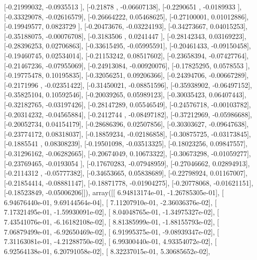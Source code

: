 \documentclass{article}
\begin{document}
       [-0.21999032, -0.0935513 ],
       [-0.21878   , -0.06607138],
       [-0.2290651 , -0.0189933 ],
       [-0.33329078, -0.02616579],
       [-0.26664222,  0.05468625],
       [-0.27100001,  0.01012886],
       [-0.19949577,  0.0823729 ],
       [-0.20473676, -0.03224193],
       [-0.34273667,  0.04015253],
       [-0.35188075, -0.00076708],
       [-0.3183506 ,  0.0241447 ],
       [-0.28142343,  0.03169223],
       [-0.28396253,  0.02706863],
       [-0.33615495, -0.05995591],
       [-0.20461433, -0.09150458],
       [-0.19460745,  0.02534014],
       [-0.21153242,  0.08517602],
       [-0.23658394, -0.07427764],
       [-0.21467236, -0.07955069],
       [-0.24913084, -0.00920076],
       [-0.17825295,  0.0578553 ],
       [-0.19775478,  0.10195835],
       [-0.32056251,  0.09206366],
       [-0.24394706, -0.00667289],
       [-0.2171996 , -0.02351422],
       [-0.31450021, -0.08851596],
       [-0.35938902, -0.06497152],
       [-0.35825104,  0.10592546],
       [-0.20039265,  0.05989123],
       [-0.30035423,  0.06407443],
       [-0.32182765, -0.03197426],
       [-0.28147289,  0.05546549],
       [-0.24576718, -0.00103782],
       [-0.20314232, -0.04565884],
       [-0.2412744 , -0.08497182],
       [-0.37212969, -0.05986688],
       [-0.20052734,  0.04154179],
       [-0.28686396,  0.02507856],
       [-0.30303627, -0.09647638],
       [-0.23774172,  0.08318037],
       [-0.18859234, -0.02186858],
       [-0.30875725, -0.03173845],
       [-0.1885541 ,  0.08308239],
       [-0.19501098, -0.03513325],
       [-0.18023256,  0.09847557],
       [-0.31296162, -0.06282665],
       [-0.20674049,  0.10673322],
       [-0.30673298, -0.01059277],
       [-0.23769465, -0.0193054 ],
       [-0.17670283, -0.07948959],
       [-0.27046662,  0.02894913],
       [-0.2114312 , -0.05777382],
       [-0.34653665,  0.05838689],
       [-0.22798924,  0.01167007],
       [-0.21854414, -0.08881147],
       [-0.18871778, -0.01904275],
       [-0.20778068, -0.01621151],
       [-0.18523849, -0.05006206]]), array([[  6.94813174e-01,  -1.26785305e-01],
       [  6.94676440e-01,   9.69144564e-04],
       [  7.11207910e-01,  -2.36036376e-02],
       [  7.17321495e-01,  -1.59930091e-02],
       [  8.04048765e-01,  -1.34975327e-02],
       [  7.43541076e-01,  -6.16182108e-02],
       [  8.81385999e-01,  -1.88155793e-02],
       [  7.06879499e-01,  -6.92650469e-02],
       [  6.91995375e-01,  -9.08939347e-02],
       [  7.31163081e-01,  -4.21288750e-02],
       [  6.99300440e-01,   4.93354072e-02],
       [  6.92564138e-01,   6.20791058e-02],
       [  8.32237015e-01,   5.30685652e-02],
\end{document}
